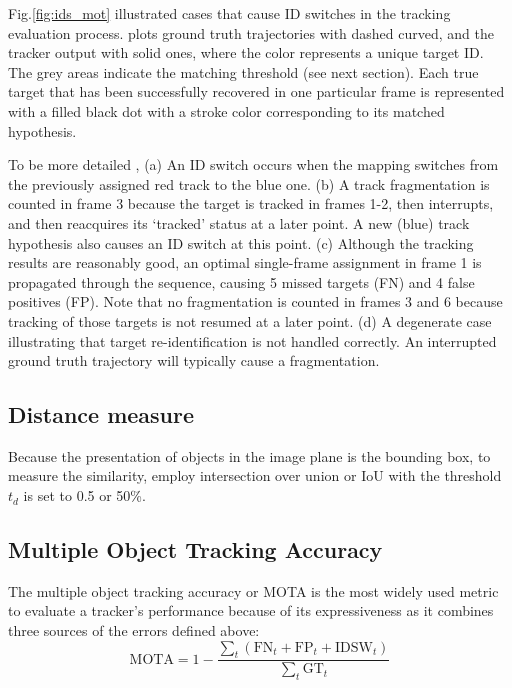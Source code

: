 Fig.\ref{fig:ids_mot}\cite{Milan2016MOT16AB} illustrated cases that cause \acrshort{ID} switches in the tracking evaluation process. 
\cite{Milan2016MOT16AB} plots ground truth trajectories with dashed curved, and the tracker output with solid ones, 
where the color represents a unique target \acrshort{ID}. The grey areas indicate the matching threshold (see next section). Each
true target that has been successfully recovered in one particular frame is represented with a filled black dot with a stroke color corresponding to its matched hypothesis.\par 
To be more detailed\cite{Milan2016MOT16AB} , (a) An \acrshort{ID} switch occurs when the mapping switches from the previously assigned red track to the blue one. (b) A track fragmentation is counted in frame 3 because the target is tracked in frames 1-2, then interrupts, and then reacquires its ‘tracked’ status at a later point. A new (blue) track hypothesis also causes an \acrshort{ID} switch at this point. (c) Although the tracking results are reasonably good, an optimal single-frame assignment in frame 1 is propagated through the sequence, causing 5 missed targets (\acrshort{FN}) and 4 false positives (\acrshort{FP}). Note that no fragmentation is counted in frames 3 and 6 because tracking of those targets is not resumed at a later point. (d) A degenerate case illustrating that target re-identification is not handled correctly. An interrupted ground truth trajectory will typically cause a fragmentation.
\subsection{Distance measure}
\hspace{0.45cm}Because the presentation of objects in the image plane is the bounding box, to measure the similarity, \cite{Milan2016MOT16AB} employ intersection over union or \acrshort{IoU} with the threshold $t_d$ is set to 0.5 or 50\%.
\subsection{Multiple Object Tracking Accuracy}
The multiple object tracking accuracy or \acrshort{MOTA} is the most widely used metric to evaluate a tracker's performance because of its expressiveness as it combines three 
sources of the errors defined above:
\begin{equation}
    \text{MOTA} = 1 - \frac{\sum_t(\text{FN}_t + \text{FP}_t + \text{IDSW}_t)}{\sum_t\text{GT}_t}
\end{equation}
